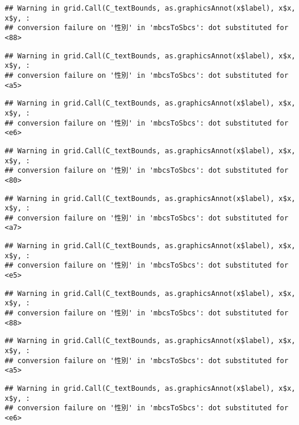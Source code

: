 \documentclass[
]{book}
\begin{document}
\begin{verbatim}
## Warning in grid.Call(C_textBounds, as.graphicsAnnot(x$label), x$x, x$y, :
## conversion failure on '性別' in 'mbcsToSbcs': dot substituted for <88>
\end{verbatim}

\begin{verbatim}
## Warning in grid.Call(C_textBounds, as.graphicsAnnot(x$label), x$x, x$y, :
## conversion failure on '性別' in 'mbcsToSbcs': dot substituted for <a5>
\end{verbatim}

\begin{verbatim}
## Warning in grid.Call(C_textBounds, as.graphicsAnnot(x$label), x$x, x$y, :
## conversion failure on '性別' in 'mbcsToSbcs': dot substituted for <e6>
\end{verbatim}

\begin{verbatim}
## Warning in grid.Call(C_textBounds, as.graphicsAnnot(x$label), x$x, x$y, :
## conversion failure on '性別' in 'mbcsToSbcs': dot substituted for <80>
\end{verbatim}

\begin{verbatim}
## Warning in grid.Call(C_textBounds, as.graphicsAnnot(x$label), x$x, x$y, :
## conversion failure on '性別' in 'mbcsToSbcs': dot substituted for <a7>
\end{verbatim}

\begin{verbatim}
## Warning in grid.Call(C_textBounds, as.graphicsAnnot(x$label), x$x, x$y, :
## conversion failure on '性別' in 'mbcsToSbcs': dot substituted for <e5>
\end{verbatim}

\begin{verbatim}
## Warning in grid.Call(C_textBounds, as.graphicsAnnot(x$label), x$x, x$y, :
## conversion failure on '性別' in 'mbcsToSbcs': dot substituted for <88>
\end{verbatim}

\begin{verbatim}
## Warning in grid.Call(C_textBounds, as.graphicsAnnot(x$label), x$x, x$y, :
## conversion failure on '性別' in 'mbcsToSbcs': dot substituted for <a5>
\end{verbatim}

\begin{verbatim}
## Warning in grid.Call(C_textBounds, as.graphicsAnnot(x$label), x$x, x$y, :
## conversion failure on '性別' in 'mbcsToSbcs': dot substituted for <e6>
\end{verbatim}
\end{document}
